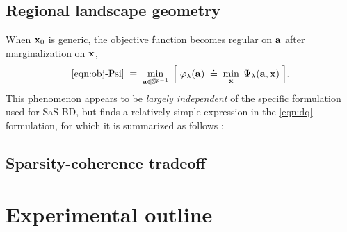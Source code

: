 \documentclass{article}
\numberwithin{equation}{section}
\begin{document}
\subsection{Regional landscape geometry}
When $\mathbf{x}_0$ is generic, the objective function becomes regular on $\mathbf{a}$ after marginalization on $\mathbf{x}$,
\begin{equation} \label{eqn:obj-phi}
  \eqref{eqn:obj-Psi} \;\equiv\; \min_{\mathbf{a} \in \mathbb{S}^{p-1}} \;\Big[\;
    \varphi_\lambda(\mathbf{a}) \;\doteq\; \min_{\mathbf{x}}\; \Psi_\lambda(\mathbf{a}, \mathbf{x})
  \;\Big].
\end{equation}
This phenomenon appears to be {\em largely independent} of the specific formulation used for SaS-BD, but finds a relatively simple expression in the \eqref{eqn:dq} formulation, for which it is summarized as follows \cite{kuo2019geometry}:


\subsection{Sparsity-coherence tradeoff}


\section{Experimental outline}

{\small


}
\end{document}
